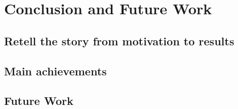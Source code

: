 \chapter{Conclusion and Future Work}

\section{Retell the story from motivation to results}

\section{Main achievements}

\section{Future Work}